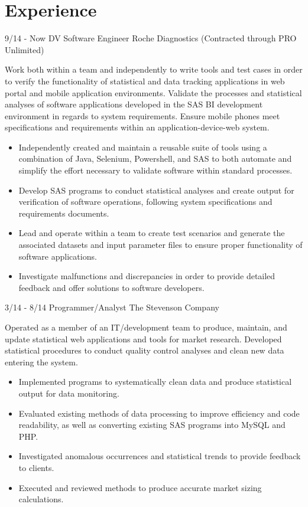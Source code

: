 \documentclass[]{./moak-resume}
\begin{document}
\section{Experience}
\begin{entrylist}
  \entry
    {9/14 - Now}
    {DV Software Engineer}
    {Roche Diagnostics (Contracted through PRO Unlimited)}
    {Work both within a team and independently to write tools and test cases in order to verify the functionality of statistical and data tracking applications in web portal and mobile application environments. Validate the processes and statistical analyses of software applications developed in the SAS BI development environment in regards to system requirements. Ensure mobile phones meet specifications and requirements within an application-device-web system.
    	\begin{itemize}
    		\item Independently created and maintain a reusable suite of tools using a combination of Java, Selenium, Powershell, and SAS to both automate and simplify the effort necessary to validate software within standard processes.
    		\item Develop SAS programs to conduct statistical analyses and create output for verification of software operations, following system specifications and requirements documents.
    		\item Lead and operate within a team to create test scenarios and generate the associated datasets and input parameter files to ensure proper functionality of software applications.
    		\item Investigate malfunctions and discrepancies in order to provide detailed feedback and offer solutions to software developers.
    	\end{itemize}}
  \entry
    {3/14 - 8/14}
    {Programmer/Analyst}
    {The Stevenson Company}
    {Operated as a member of an IT/development team to produce, maintain, and update statistical web applications and tools for market research. Developed statistical procedures to conduct quality control analyses and clean new data entering the system.
    	\begin{itemize}
    		\item Implemented programs to systematically clean data and produce statistical output for data monitoring.
     		\item Evaluated existing methods of data processing to improve efficiency and code readability, as well as converting existing SAS programs into MySQL and PHP.
     		\item Investigated anomalous occurrences and statistical trends to provide feedback to clients.
     		\item Executed and reviewed methods to produce accurate market sizing calculations.
    	\end{itemize}}
\end{entrylist}
\\
\end{document}
